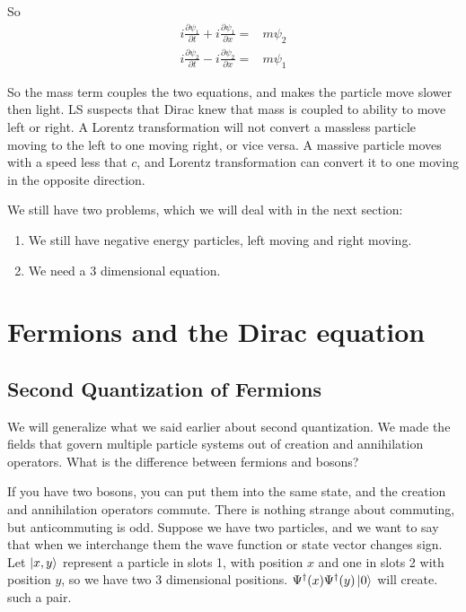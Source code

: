 \documentclass[]{article}
\begin{document}
So
\begin{align*}
	i\frac{\partial \psi_1}{\partial t} + i\frac{\partial \psi_1}{\partial x}=&m \psi_2\\
	i\frac{\partial \psi_2}{\partial t} - i\frac{\partial \psi_2}{\partial x}=&m \psi_1
\end{align*}

So the mass term couples the two equations, and makes the particle move slower then light. LS suspects that Dirac knew that mass is coupled to ability to move left or right. A Lorentz transformation will not convert a massless particle moving to the left to one moving right, or vice versa. A massive particle moves with a speed less that $c$, and  Lorentz transformation can convert it to one moving in the opposite direction.

We still have two problems,  which we will deal with in the next section:

\begin{enumerate}
	\item We still have negative energy particles, left moving and right moving.
	\item We need a 3 dimensional equation.
\end{enumerate}

\section{Fermions and the Dirac equation}\label{section:fermions:dirac}

\subsection{Second Quantization of Fermions}

We will generalize what we said earlier about second quantization. We made the fields that govern multiple particle systems out of creation and annihilation operators. What is the difference between fermions and bosons?

If you have two bosons, you can put them into the same state, and the creation and annihilation operators commute. There is nothing strange about commuting, but anticommuting is odd. Suppose we have two particles, and we want to say that when we interchange them the wave function or state vector changes sign.  Let $\ket{x,y}$ represent a particle in slots 1, with position $x$ and one in slots 2 with position $y$, so we have two 3 dimensional positions. $\Psi^\dagger(x)\Psi^\dagger(y)\ket{0}$ will create. such a pair.
\end{document}
